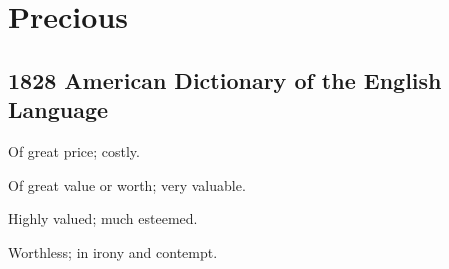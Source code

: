 \section{Precious}
	\label{PRECIOUS}
	

\subsection{1828 American Dictionary of the English Language} %
	\label{PRECIOUS-1828}

	\begin{compactitem}
		\item[1] Of great price; costly.
		\item[2] Of great value or worth; very valuable.
		\item[3] Highly valued; much esteemed.
		\item[4] Worthless; in irony and contempt.
	\end{compactitem}




	
